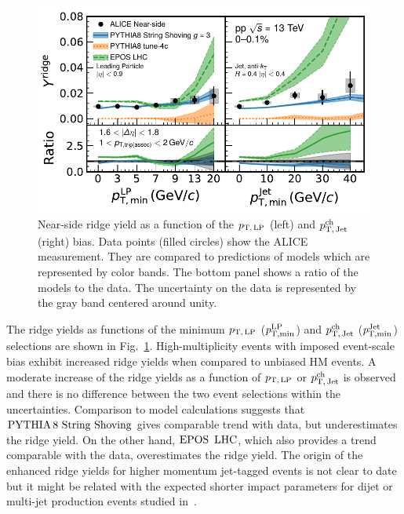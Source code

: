 \begin{figure}[h!]
	\centering
	\includegraphics[width=0.89\linewidth]{./figures/Fig6_RidgeYieldESE.pdf}
	\caption{Near-side ridge yield as a function of the $p_\mathrm{T,\,LP}$ (left) and $p_\mathrm{T,\,Jet}^\mathrm{ch}$ (right) bias. Data points (filled circles) show the ALICE measurement. They are compared to predictions of models which are represented by color bands. The bottom panel shows a ratio of the models to the data. The uncertainty on the data is represented by the gray band centered around unity.}
	\label{fig:RidgeYield_ESE}
\end{figure}

The ridge yields as functions of the minimum $p_\mathrm{T,\,LP}$ ($\it{p}^{\rm{LP}}_{\rm{T,min}}$) and $p_\mathrm{T,\,Jet}^\mathrm{ch}$ ($\it{p}^{\rm{Jet}}_{\rm{T,min}}$) selections are shown in Fig.~\ref{fig:RidgeYield_ESE}. High-multiplicity events with imposed event-scale bias exhibit increased ridge yields when compared to unbiased HM events. A moderate increase of the ridge yields as a function of $p_\mathrm{T,\,LP}$ or $p_\mathrm{T,\,Jet}^\mathrm{ch}$ is observed and there is no difference between the two event selections within the uncertainties.
Comparison to model calculations suggests that ${\mathrm{PYTHIA}\,8~\mathrm{String}~}\mathrm{Shoving}$ gives comparable trend with data, but underestimates the ridge yield. On the other hand, ${\mathrm{EPOS}\,~\mathrm{LHC}}$, which also provides a trend comparable with the data, overestimates the ridge yield. The origin of the enhanced ridge yields for higher momentum jet-tagged events is not clear to date but it might be related with the expected shorter impact parameters for dijet or multi-jet production events studied in~\cite{Frankfurt:2010ea}.

